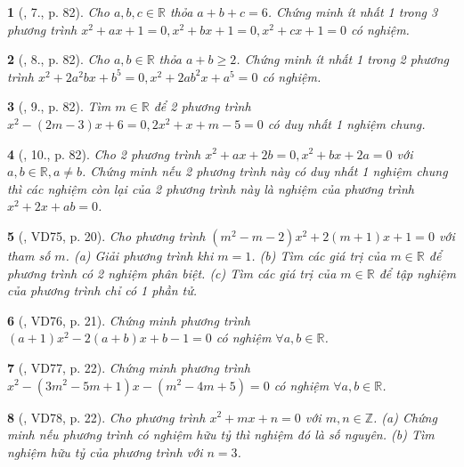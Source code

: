 \documentclass{article}
\newtheorem{baitoan}{}
\begin{document}
\begin{baitoan}[\cite{Thu_Viet_Minh_ptb2}, 7., p. 82]
	Cho $a,b,c\in\mathbb{R}$ thỏa $a + b + c = 6$. Chứng minh ít nhất 1 trong 3 phương trình $x^2 + ax + 1 = 0,x^2 + bx + 1 = 0,x^2 + cx + 1 = 0$ có nghiệm.
\end{baitoan}

\begin{baitoan}[\cite{Thu_Viet_Minh_ptb2}, 8., p. 82]
	Cho $a,b\in\mathbb{R}$ thỏa $a + b\ge2$. Chứng minh ít nhất 1 trong 2 phương trình $x^2 + 2a^2bx + b^5 = 0,x^2 + 2ab^2x + a^5 = 0$ có nghiệm.
\end{baitoan}

\begin{baitoan}[\cite{Thu_Viet_Minh_ptb2}, 9., p. 82]
	Tìm $m\in\mathbb{R}$ để 2 phương trình $x^2 - (2m - 3)x + 6 = 0,2x^2 + x + m - 5 = 0$ có duy nhất 1 nghiệm chung.
\end{baitoan}

\begin{baitoan}[\cite{Thu_Viet_Minh_ptb2}, 10., p. 82]
	Cho 2 phương trình $x^2 + ax + 2b = 0,x^2 + bx + 2a = 0$ với $a,b\in\mathbb{R},a\ne b$. Chứng minh nếu 2 phương trình này có duy nhất 1 nghiệm chung thì các nghiệm còn lại của 2 phương trình này là nghiệm của phương trình $x^2 + 2x + ab = 0$.
\end{baitoan}

\begin{baitoan}[\cite{Binh_Toan_9_tap_2}, VD75, p. 20]
	Cho phương trình $(m^2 - m - 2)x^2 + 2(m + 1)x + 1 = 0$ với tham số $m$. (a) Giải phương trình khi $m = 1$. (b) Tìm các giá trị của $m\in\mathbb{R}$ để phương trình có 2 nghiệm phân biệt. (c) Tìm các giá trị của $m\in\mathbb{R}$ để tập nghiệm của phương trình chỉ có 1 phần tử.
\end{baitoan}

\begin{baitoan}[\cite{Binh_Toan_9_tap_2}, VD76, p. 21]
	Chứng minh phương trình $(a + 1)x^2 - 2(a + b)x + b - 1 = 0$ có nghiệm $\forall a,b\in\mathbb{R}$.
\end{baitoan}

\begin{baitoan}[\cite{Binh_Toan_9_tap_2}, VD77, p. 22]
	Chứng minh phương trình $x^2 - (3m^2 - 5m + 1)x - (m^2 - 4m + 5) = 0$ có nghiệm $\forall a,b\in\mathbb{R}$.
\end{baitoan}

\begin{baitoan}[\cite{Binh_Toan_9_tap_2}, VD78, p. 22]
	Cho phương trình $x^2 + mx + n = 0$ với $m,n\in\mathbb{Z}$. (a) Chứng minh nếu phương trình có nghiệm hữu tỷ thì nghiệm đó là số nguyên. (b) Tìm nghiệm hữu tỷ của phương trình với $n = 3$.
\end{baitoan}
\end{document}

